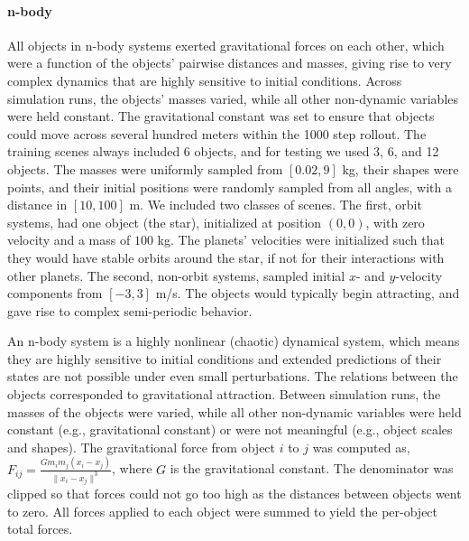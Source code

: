 \paragraph{n-body}
All objects in n-body systems exerted gravitational forces on each
other, which were a function of the objects' pairwise distances and
masses, giving rise to very complex dynamics that are highly sensitive
to initial conditions. Across simulation runs, the objects' masses
varied, while all other non-dynamic variables were held constant. The
gravitational constant was set to ensure that objects could move
across several hundred meters within the 1000 step rollout. The
training scenes always included 6 objects, and for testing we used 3,
6, and 12 objects. The masses were uniformly sampled from $[0.02,9]$
kg, their shapes were points, and their initial positions were
randomly sampled from all angles, with a distance in $[10,100]$ m. We
included two classes of scenes. The first, orbit systems, had one
object (the star), initialized at position $(0,0)$, with zero velocity
and a mass of $100$ kg. The planets' velocities were initialized such
that they would have stable orbits around the star, if not for their
interactions with other planets. The second, non-orbit systems,
sampled initial $x$- and $y$-velocity components from $[-3,3]$
m/s. The objects would typically begin attracting, and gave rise to
complex semi-periodic behavior.

An n-body system is a highly nonlinear (chaotic) dynamical system,
which means they are highly sensitive to initial conditions and
extended predictions of their states are not possible under even small
perturbations. The relations between the objects corresponded to
gravitational attraction. Between simulation runs, the masses of the
objects were varied, while all other non-dynamic variables were held
constant (e.g., gravitational constant) or were not meaningful (e.g.,
object scales and shapes). The gravitational force from object $i$ to
$j$ was computed as, $F_{ij}=\frac{G m_i m_j (x_i - x_j)}{\|x_i -
x_j\| ^ 3}$, where $G$ is the gravitational constant. The denominator
was clipped so that forces could not go too high as the distances
between objects went to zero. All forces applied to each object were
summed to yield the per-object total forces.

